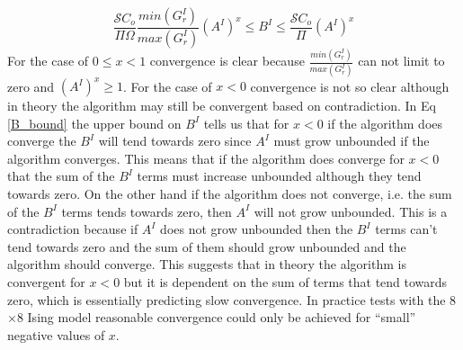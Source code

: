\documentclass[a4paper,12pt]{article}
\begin{document}
\begin{equation}
 \frac{\mathcal{S}C_o}{\Pi\Omega} \frac{min(G_r^{I})}{ max(G_r^{I})}(A^I)^x \le B^I  \le  \frac{\mathcal{S}C_o}{\Pi}(A^I)^x
 \label{B_bound}
\end{equation}
For the case of $0\le x < 1 $ convergence is clear because $\frac{min(G_r^{I})}{ max(G_r^{I})}$ can not limit to zero and $(A^I)^x \ge 1$. For the case of $x < 0$ convergence is not so clear although in theory the algorithm may still be convergent based on contradiction. In Eq \ref{B_bound} the upper bound on $B^I$ tells us that for $x<0$ if the algorithm does converge the $B^I$ will tend towards zero since $A^I$ must grow unbounded if the algorithm converges. This means that if the algorithm does converge for $x<0$ that the sum of the $B^I$ terms must increase unbounded although they tend towards zero. On the other hand if the algorithm does not converge, i.e. the sum of the $B^I$ terms tends towards zero, then $A^I$ will not grow unbounded. This is a contradiction because if $A^I$ does not grow unbounded then the $B^I$ terms can't tend towards zero and the sum of them should grow unbounded and the algorithm should converge. This suggests that in theory the algorithm is convergent for $x<0$ but it is dependent on the sum of terms that tend towards zero, which is essentially predicting slow convergence. In practice tests with the 8$\times$8 Ising model reasonable convergence could only be achieved for ``small'' negative values of $x$. 
\end{document}
